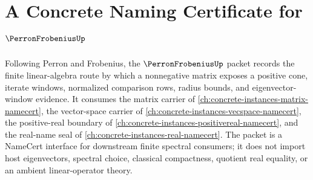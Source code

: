 \chapter{A Concrete Naming Certificate for $\PerronFrobeniusUp$}
\label{ch:concrete-instances-perron-frobenius-namecert}

Following Perron and Frobenius, the $\PerronFrobeniusUp$ packet records the finite linear-algebra route by which a nonnegative matrix exposes a positive cone, iterate windows, normalized comparison rows, radius bounds, and eigenvector-window evidence. It consumes the matrix carrier of \autoref{ch:concrete-instances-matrix-namecert}, the vector-space carrier of \autoref{ch:concrete-instances-vecspace-namecert}, the positive-real boundary of \autoref{ch:concrete-instances-positivereal-namecert}, and the real-name seal of \autoref{ch:concrete-instances-real-namecert}. The packet is a NameCert interface for downstream finite spectral consumers; it does not import host eigenvectors, spectral choice, classical compactness, quotient real equality, or an ambient linear-operator theory.

